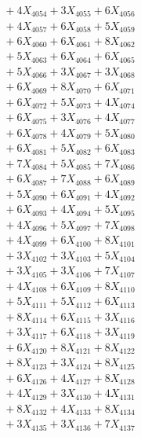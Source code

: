 \documentclass[a4paper,10pt]{article}
\begin{document}
{\begin{align}
&\;  + 4 X_{4054} + 3 X_{4055} + 6 X_{4056} \\[0.3ex]
&\;  + 4 X_{4057} + 6 X_{4058} + 5 X_{4059} \\[0.5ex]\allowbreak
&\;  + 6 X_{4060} + 6 X_{4061} + 8 X_{4062} \\[0.3ex]
&\;  + 5 X_{4063} + 6 X_{4064} + 6 X_{4065} \\[0.3ex]
&\;  + 5 X_{4066} + 3 X_{4067} + 3 X_{4068} \\[0.3ex]
&\;  + 6 X_{4069} + 8 X_{4070} + 6 X_{4071} \\[0.3ex]
&\;  + 6 X_{4072} + 5 X_{4073} + 4 X_{4074} \\[0.3ex]
&\;  + 6 X_{4075} + 3 X_{4076} + 4 X_{4077} \\[0.3ex]
&\;  + 6 X_{4078} + 4 X_{4079} + 5 X_{4080} \\[0.3ex]
&\;  + 6 X_{4081} + 5 X_{4082} + 6 X_{4083} \\[0.3ex]
&\;  + 7 X_{4084} + 5 X_{4085} + 7 X_{4086} \\[0.3ex]
&\;  + 6 X_{4087} + 7 X_{4088} + 6 X_{4089} \\[0.5ex]\allowbreak
&\;  + 5 X_{4090} + 6 X_{4091} + 4 X_{4092} \\[0.3ex]
&\;  + 6 X_{4093} + 4 X_{4094} + 5 X_{4095} \\[0.3ex]
&\;  + 4 X_{4096} + 5 X_{4097} + 7 X_{4098} \\[0.3ex]
&\;  + 4 X_{4099} + 6 X_{4100} + 8 X_{4101} \\[0.3ex]
&\;  + 3 X_{4102} + 3 X_{4103} + 5 X_{4104} \\[0.3ex]
&\;  + 3 X_{4105} + 3 X_{4106} + 7 X_{4107} \\[0.3ex]
&\;  + 4 X_{4108} + 6 X_{4109} + 8 X_{4110} \\[0.3ex]
&\;  + 5 X_{4111} + 5 X_{4112} + 6 X_{4113} \\[0.3ex]
&\;  + 8 X_{4114} + 6 X_{4115} + 3 X_{4116} \\[0.3ex]
&\;  + 3 X_{4117} + 6 X_{4118} + 3 X_{4119} \\[0.5ex]\allowbreak
&\;  + 6 X_{4120} + 8 X_{4121} + 8 X_{4122} \\[0.3ex]
&\;  + 8 X_{4123} + 3 X_{4124} + 8 X_{4125} \\[0.3ex]
&\;  + 6 X_{4126} + 4 X_{4127} + 8 X_{4128} \\[0.3ex]
&\;  + 4 X_{4129} + 3 X_{4130} + 4 X_{4131} \\[0.3ex]
&\;  + 8 X_{4132} + 4 X_{4133} + 8 X_{4134} \\[0.3ex]
&\;  + 3 X_{4135} + 3 X_{4136} + 7 X_{4137} \\[0.3ex]

\end{align}}
\end{document}
